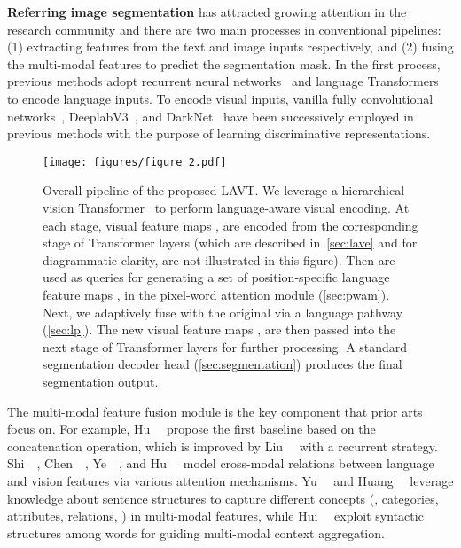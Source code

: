 \documentclass[10pt,twocolumn,letterpaper]{article}
\begin{document}
\noindent \textbf{Referring image segmentation}
has attracted growing attention in the research community and there are two main processes in conventional pipelines: (1) extracting features from the text and image inputs respectively, and (2) fusing the multi-modal features to predict the segmentation mask.
In the first process, previous methods adopt recurrent neural networks~\cite{hu2016segmentation, lstm, liu2017recurrentInter, Li2018rrn, Jing_2021_Locate} and language Transformers~\cite{refvos, bert} to encode language inputs.
To encode visual inputs, vanilla fully convolutional networks~\cite{fcn, hu2016segmentation, liu2017recurrentInter}, DeeplabV3~\cite{deeplabv3, Li2018rrn, refvos}, and DarkNet~\cite{darknet, Luo_2020_mcn, Jing_2021_Locate} have been successively employed in previous methods with the purpose of learning discriminative representations.


\begin{figure*}[th]
\centering
\texttt{[image: figures/figure\_2.pdf]}
\vspace{5pt}
\caption{Overall pipeline of the proposed LAVT. We leverage a hierarchical vision Transformer~\cite{Liu_2021_swin} to perform language-aware visual encoding.
At each stage, visual feature maps ,  are encoded from the corresponding stage of Transformer layers (which are described in~\cref{sec:lave} and for diagrammatic clarity, are not illustrated in this figure). Then  are used as queries for generating a set of position-specific language feature maps ,  in the pixel-word attention module (\cref{sec:pwam}). Next, we adaptively fuse  with the original  via a language pathway (\cref{sec:lp}). The new visual feature maps ,  are then passed into the next stage of Transformer layers for further processing. A standard segmentation decoder head (\cref{sec:segmentation}) produces the final segmentation output.}
\label{fig:2}
\end{figure*}


The multi-modal feature fusion module is the key component that prior arts focus on.
For example, Hu~\etal~\cite{hu2016segmentation} propose the first baseline based on the concatenation operation, which is improved by Liu~\etal~\cite{liu2017recurrentInter} with a recurrent strategy.
Shi~\etal~\cite{shi2018key}, Chen~\etal~\cite{chen2019see}, Ye~\etal~\cite{ye2019cross}, and Hu~\etal~\cite{hu2020brinet} model cross-modal relations between language and vision features via various attention mechanisms.
Yu~\etal~\cite{yu2018mattnet} and Huang~\etal~\cite{huang2020CMPC} leverage knowledge about sentence structures to capture different concepts (\eg, categories, attributes, relations, \etc) in multi-modal features, while Hui~\etal~\cite{hui2020linguistic} exploit syntactic structures among words for guiding multi-modal context aggregation.
\end{document}
